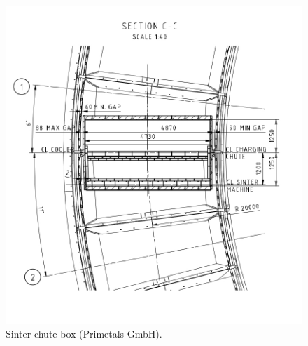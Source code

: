 \begin{figure}[!htb]
\centering
\includegraphics[width=.80\columnwidth]{images/056sinterChuteBox}
\caption[Sinter chute box]{Sinter chute box (Primetals GmbH).}
\label{fig:056sinterChuteBox}
\end{figure}